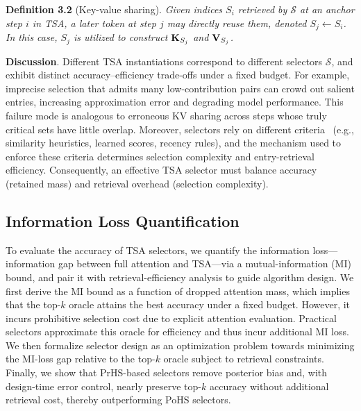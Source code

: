 \textbf{Definition 3.2} (Key-value sharing). \textit{Given indices $S_i$ retrieved by $\mathcal S$ at an anchor step $i$ in TSA, a later token at step $j$ may directly reuse them, denoted $S_j \leftarrow S_i$. In this case, $S_j$ is utilized to construct $\mathbf{K}_{S_j}$ and $\mathbf{V}_{S_j}$.}

\textbf{Discussion}. Different TSA instantiations correspond to different selectors $\mathcal{S}$, and exhibit distinct accuracy–efficiency trade-offs under a fixed budget. For example, imprecise selection that admits many low-contribution pairs can crowd out salient entries, increasing approximation error and degrading model performance. This failure mode is analogous to erroneous KV sharing across steps whose truly critical sets have little overlap. Moreover, selectors rely on different criteria~\cite{liu2024hashevict,zhang2023h2o,sun2024shadowkv} (e.g., similarity heuristics, learned scores, recency rules), and the mechanism used to enforce these criteria determines selection complexity and entry-retrieval efficiency. Consequently, an effective TSA selector must balance accuracy (retained mass) and retrieval overhead (selection complexity).



\vspace{-0.05in}
\subsection{Information Loss Quantification}
\label{sec:info_bound}

To evaluate the accuracy of TSA selectors, we quantify the information loss—information gap between full attention and TSA—via a mutual-information (MI) bound, and pair it with retrieval-efficiency analysis to guide algorithm design. We first derive the MI bound as a function of dropped attention mass, which implies that the top-$k$ oracle attains the best accuracy under a fixed budget. However, it incurs prohibitive selection cost due to explicit attention evaluation. Practical selectors approximate this oracle for efficiency and thus incur additional MI loss. We then formalize selector design as an optimization problem towards minimizing the MI-loss gap relative to the top-$k$ oracle subject to retrieval constraints. Finally, we show that PrHS-based selectors remove posterior bias and, with design-time error control, nearly preserve top-$k$ accuracy without additional retrieval cost, thereby outperforming PoHS selectors.

